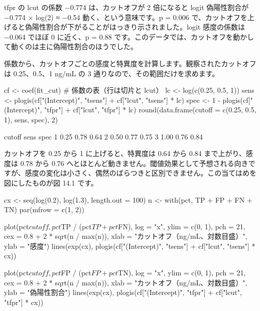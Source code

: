 tfpr の lcut の係数 −0.774 は、カットオフが 2 倍になると logit 偽陽性割合が −0.774 × log(2) ≈ −0.54 動く、という意味です。p = 0.006 で、カットオフを上げると偽陽性割合が下がることがはっきり示されました。logit 感度の係数は −0.064 でほぼ 0 に近く、p = 0.88 です。このデータでは、カットオフを動かして動くのは主に偽陽性割合のほうでした。

係数から、カットオフごとの感度と特異度を計算します。観察されたカットオフは 0.25、0.5、1 ng/mL の 3 通りなので、その範囲だけを求めます。

\begin{rcode}
cf <- coef(fit_cut)      # 係数の表（行は切片と lcut）
lc <- log(c(0.25, 0.5, 1))
sens <- plogis(cf["(Intercept)", "tsens"] +
               cf["lcut", "tsens"] * lc)
spec <- 1 - plogis(cf["(Intercept)", "tfpr"] +
                   cf["lcut", "tfpr"] * lc)
round(data.frame(cutoff = c(0.25, 0.5, 1), sens, spec), 2)
\end{rcode}

\begin{rout}
  cutoff sens spec
1   0.25 0.78 0.64
2   0.50 0.77 0.75
3   1.00 0.76 0.84
\end{rout}

カットオフを 0.25 から 1 に上げると、特異度は 0.64 から 0.84 まで上がり、感度は 0.78 から 0.76 へとほとんど動きません。閾値効果として予想される向きですが、感度の変化は小さく、偶然のばらつきと区別できません。この当てはめを図にしたものが図 14.1 です。


\begin{rcode}
cx <- seq(log(0.2), log(1.3), length.out = 100)
n  <- with(pct, TP + FP + FN + TN)
par(mfrow = c(1, 2))

plot(pct$cutoff, pct$TP / (pct$TP + pct$FN), log = "x",
     ylim = c(0, 1), pch = 21, cex = 0.8 + 2 * sqrt(n / max(n)),
     xlab = "カットオフ（ng/mL、対数目盛）", ylab = "感度")
lines(exp(cx), plogis(cf["(Intercept)", "tsens"] +
                      cf["lcut", "tsens"] * cx))

plot(pct$cutoff, pct$FP / (pct$FP + pct$TN), log = "x",
     ylim = c(0, 1), pch = 21, cex = 0.8 + 2 * sqrt(n / max(n)),
     xlab = "カットオフ（ng/mL、対数目盛）", ylab = "偽陽性割合")
lines(exp(cx), plogis(cf["(Intercept)", "tfpr"] +
                      cf["lcut", "tfpr"] * cx))
\end{rcode}

